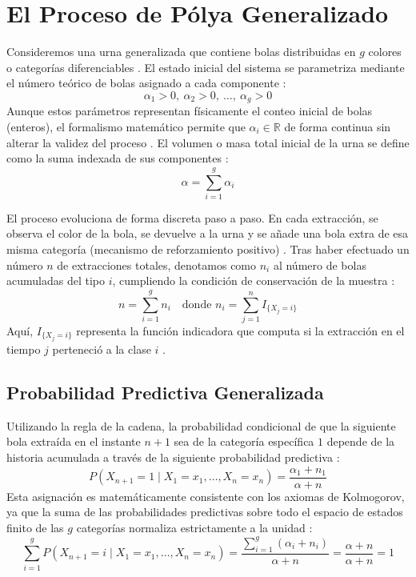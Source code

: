 \section{El Proceso de Pólya Generalizado}


Consideremos una urna generalizada que contiene bolas distribuidas en $g$ colores o categorías diferenciables . El estado inicial del sistema se parametriza mediante el número teórico de bolas asignado a cada componente :
\begin{equation*}
    \alpha_1 > 0, \ \alpha_2 > 0, \ \dots, \ \alpha_g > 0 
\end{equation*}
Aunque estos parámetros representan físicamente el conteo inicial de bolas (enteros), el formalismo matemático permite que $\alpha_i \in \mathbb{R}$ de forma continua sin alterar la validez del proceso . El volumen o masa total inicial de la urna se define como la suma indexada de sus componentes :
\begin{equation*}
    \alpha = \sum_{i=1}^{g} \alpha_i 
\end{equation*}

El proceso evoluciona de forma discreta paso a paso. En cada extracción, se observa el color de la bola, se devuelve a la urna y se añade una bola extra de esa misma categoría (mecanismo de reforzamiento positivo) . Tras haber efectuado un número $n$ de extracciones totales, denotamos como $n_i$ al número de bolas acumuladas del tipo $i$, cumpliendo la condición de conservación de la muestra :
\begin{equation*}
    n = \sum_{i=1}^{g} n_i \quad \text{donde } n_i = \sum_{j=1}^{n} I_{\{X_j = i\}} 
\end{equation*}
Aquí, $I_{\{X_j = i\}}$ representa la función indicadora que computa si la extracción en el tiempo $j$ perteneció a la clase $i$ .

\subsection*{Probabilidad Predictiva Generalizada}
Utilizando la regla de la cadena, la probabilidad condicional de que la siguiente bola extraída en el instante $n+1$ sea de la categoría específica $1$ depende de la historia acumulada a través de la siguiente probabilidad predictiva :
\begin{equation*}
    P(X_{n+1} = 1 \mid X_1 = x_1, \dots, X_n = x_n) = \frac{\alpha_1 + n_1}{\alpha + n} 
\end{equation*}
Esta asignación es matemáticamente consistente con los axiomas de Kolmogorov, ya que la suma de las probabilidades predictivas sobre todo el espacio de estados finito de las $g$ categorías normaliza estrictamente a la unidad :
\begin{equation*}
    \sum_{i=1}^{g} P(X_{n+1} = i \mid X_1 = x_1, \dots, X_n = x_n) = \frac{\sum_{i=1}^{g}(\alpha_i + n_i)}{\alpha + n} = \frac{\alpha + n}{\alpha + n} = 1 
\end{equation*}


